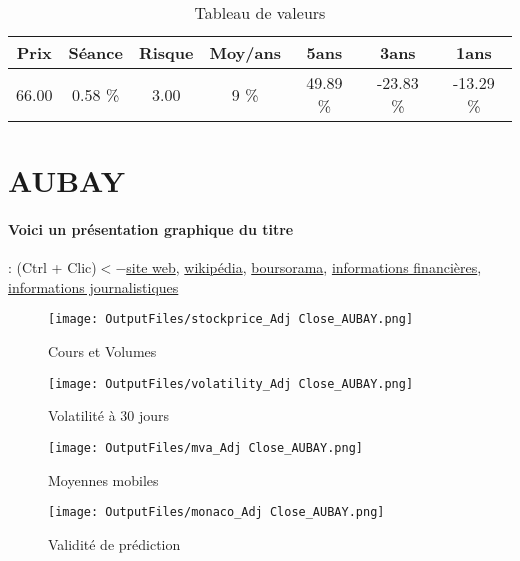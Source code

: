 \documentclass[11pt,a4paper]{report}%
\begin{document}
\begin{table}[H]
  \centering
    \begin{tabular}{|c|c|c|c|c|c|c|}
    \hline
    Prix & Séance & Risque  & Moy/ans & 5ans & 3ans & 1ans \\
    \hline
    66.00 &    0.58 \%    & 3.00 & 9 \% & 49.89 \% & -23.83 \% & -13.29 \% \\
    \hline
    \end{tabular}%
        \label{tab:table_ATOS}%
      \caption{Tableau de valeurs}
\end{table}%

\newpage

\section{AUBAY}

\paragraph{Voici un présentation graphique du titre} : (Ctrl + Clic)$<-$\href{https://www.aubay.com/}{site web}, \href{https://fr.wikipedia.org/wiki/Aubay}{wikipédia}, \href{https://www.boursorama.com/cours/1rPAUB}{boursorama}, \href{https://www.qwant.com/?q=site:https:%2f%2fwww.easybourse.com%2faction-societe%2fAUBAY&t=web&client=ext-firefox-hp}{informations financières}, \href{https://bourse.lerevenu.com/cours-de-bourse/fiche-valeur-synthese/AUBAY/AUB-FR}{informations journalistiques}
\begin{figure}[!htb]
   \begin{minipage}{0.5\textwidth}
     \centering
     \texttt{[image: OutputFiles/stockprice\_Adj Close\_AUBAY.png]}
     \caption{Cours et Volumes}\label{Fig:price_AUBAY}
   \end{minipage}\hfill
   \begin{minipage}{0.5\textwidth}
     \centering
     \texttt{[image: OutputFiles/volatility\_Adj Close\_AUBAY.png]}
     \caption{Volatilité à 30 jours}\label{Fig:volat_AUBAY}
   \end{minipage}
\end{figure}
\begin{figure}[!htb]
   \begin{minipage}{0.5\textwidth}
     \centering
     \texttt{[image: OutputFiles/mva\_Adj Close\_AUBAY.png]}
     \caption{Moyennes mobiles}\label{Fig:mva_AUBAY}
   \end{minipage}\hfill
   \begin{minipage}{0.5\textwidth}
     \centering
     \texttt{[image: OutputFiles/monaco\_Adj Close\_AUBAY.png]}
     \caption{Validité de prédiction}\label{Fig:prediction_AUBAY}
   \end{minipage}
\end{figure}
\end{document}
